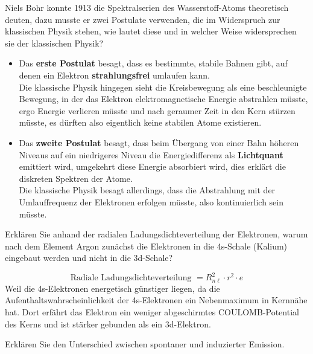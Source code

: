 \documentclass[12pt,a4paper,ngerman]{article}
\begin{document}
\begin{framed}
Niels Bohr konnte 1913 die Spektralserien des Wasserstoff-Atoms theoretisch deuten, dazu musste er zwei Postulate verwenden, die im Widerspruch zur klassischen Physik stehen, wie lautet diese und in welcher Weise widersprechen sie der klassischen Physik?
\end{framed}

\begin{itemize}
\item Das \textbf{erste Postulat} besagt, dass es bestimmte, stabile Bahnen gibt, auf denen ein Elektron \textbf{strahlungsfrei} umlaufen kann. \\
Die klassische Physik hingegen sieht die Kreisbewegung als eine beschleunigte Bewegung, in der das Elektron elektromagnetische Energie abstrahlen müsste, ergo Energie verlieren müsste und nach geraumer Zeit in den Kern stürzen müsste, es dürften also eigentlich keine stabilen Atome existieren.
\item Das \textbf{zweite Postulat} besagt, dass beim Übergang von einer Bahn höheren Niveaus auf ein niedrigeres Niveau die Energiedifferenz als \textbf{Lichtquant} emittiert wird, umgekehrt diese Energie absorbiert wird, dies erklärt die diskreten Spektren der Atome. \\
Die klassische Physik besagt allerdings, dass die Abstrahlung mit der Umlauffrequenz der Elektronen erfolgen müsste, also kontinuierlich sein müsste. 
\end{itemize}




\begin{framed}
Erklären Sie anhand der radialen Ladungsdichteverteilung der Elektronen, warum nach dem Element Argon zunächst die Elektronen in die 4s-Schale (Kalium) eingebaut werden und nicht in die 3d-Schale?
\end{framed}

\begin{equation*}
\text{Radiale Ladungsdichteverteilung } = R_{n\ell}^{2} \cdot r^2 \cdot e
\end{equation*}
Weil die 4s-Elektronen energetisch günstiger liegen, da die Aufenthaltswahrscheinlichkeit der 4s-Elektronen ein Nebenmaximum in Kernnähe hat. Dort erfährt das Elektron ein weniger abgeschirmtes COULOMB-Potential des Kerns und ist stärker gebunden als ein 3d-Elektron. 

\pagebreak

\begin{framed}
Erklären Sie den Unterschied zwischen spontaner und induzierter Emission.
\end{framed}
\end{document}
